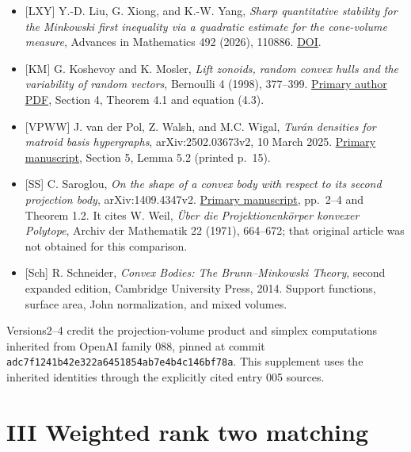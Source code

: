\documentclass[
  11pt,
]{article}
\begin{document}
\begin{itemize}
  {[}S{]} C. Saroglou, \emph{Volumes of projection bodies of some
  classes of convex bodies}, Mathematika 57 (2011), 329--353.
  \href{https://doi.org/10.1112/S0025579311001860}{DOI}.
\item
  {[}LXY{]} Y.-D. Liu, G. Xiong, and K.-W. Yang, \emph{Sharp
  quantitative stability for the Minkowski first inequality via a
  quadratic estimate for the cone-volume measure}, Advances in
  Mathematics 492 (2026), 110886.
  \href{https://doi.org/10.1016/j.aim.2026.110886}{DOI}.
\item
  {[}KM{]} G. Koshevoy and K. Mosler, \emph{Lift zonoids, random convex
  hulls and the variability of random vectors}, Bernoulli 4 (1998),
  377--399.
  \href{https://wisostat.uni-koeln.de/sites/dep_econometrics/pdf_publikationen/1998_KoshevoyM98.pdf}{Primary
  author PDF}, Section 4, Theorem 4.1 and equation (4.3).
\item
  {[}VPWW{]} J. van der Pol, Z. Walsh, and M.C. Wigal, \emph{Turán
  densities for matroid basis hypergraphs}, arXiv:2502.03673v2, 10 March
  2025. \href{https://arxiv.org/html/2502.03673v2\#S5}{Primary
  manuscript}, Section 5, Lemma 5.2 (printed p.~15).
\item
  {[}SS{]} C. Saroglou, \emph{On the shape of a convex body with respect
  to its second projection body}, arXiv:1409.4347v2.
  \href{https://arxiv.org/pdf/1409.4347v2}{Primary manuscript}, pp.~2--4
  and Theorem 1.2. It cites W. Weil, \emph{Über die Projektionenkörper
  konvexer Polytope}, Archiv der Mathematik 22 (1971), 664--672; that
  original article was not obtained for this comparison.
\item
  {[}Sch{]} R. Schneider, \emph{Convex Bodies: The Brunn--Minkowski
  Theory}, second expanded edition, Cambridge University Press, 2014.
  Support functions, surface area, John normalization, and mixed
  volumes.
\end{itemize}

Versions2--4 credit the projection-volume product and simplex
computations inherited from OpenAI family 088, pinned at commit
\nolinkurl{adc7f1241b42e322a6451854ab7e4b4c146bf78a}. This supplement uses
the inherited identities through the explicitly cited entry 005 sources.

\newpage

\section{III Weighted rank two
matching}\label{iii-weighted-rank-two-matching}
\end{document}
